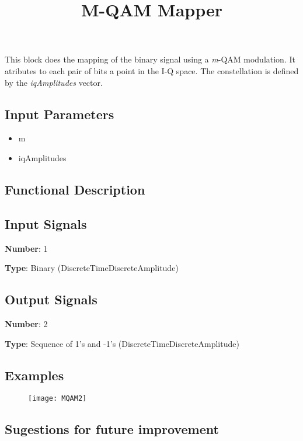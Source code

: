 \documentclass[a4paper]{article}
\title{M-QAM Mapper}
\begin{document}
	
\maketitle

This block does the mapping of the binary signal using a \textit{m}-QAM modulation. It atributes to each pair of bits a point in the I-Q space. The constellation is defined by the \textit{iqAmplitudes} vector.

\subsection*{Input Parameters}

\begin{itemize}
	\item m 
	\item iqAmplitudes 
\end{itemize}

\subsection*{Functional Description}



\subsection*{Input Signals}

\textbf{Number}: 1

\textbf{Type}: Binary (DiscreteTimeDiscreteAmplitude)

\subsection*{Output Signals}

\textbf{Number}: 2

\textbf{Type}: Sequence of 1's and -1's (DiscreteTimeDiscreteAmplitude)

\subsection*{Examples}

\begin{figure}[h]
	\texttt{[image: MQAM2]}
\end{figure}

\subsection*{Sugestions for future improvement}
\end{document}
